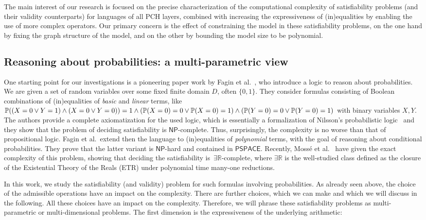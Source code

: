 \documentclass[a4paper,UKenglish,cleveref, autoref, thm-restate]{lipics-v2021}
\newcommand{\R}{\mathbb{R}}
\newcommand{\IR}{\mathbb{R}}
\newcommand{\compactEquals}[1]{\let\IsInPP=1#1\let\IsInPP=\relax}
\newcommand{\PP}[1]{\mathbb{P}(\compactEquals{#1})}
\newcommand{\existsR}{\ensuremath{\mathsf{\exists\IR}}}
\newcommand{\NP}{\ensuremath{\mathsf{NP}}}
\newcommand{\PSPACE}{\ensuremath{\mathsf{PSPACE}}}
\begin{document}
The main interest of our research is focused on the precise characterization of the computational complexity of satisfiability problems (and their validity counterparts) for languages of all PCH layers, combined with increasing the expressiveness of (in)equalities by enabling the use of more 
complex operators. Our primary concern is the effect of constraining the model in these satisfiability problems, on the one hand by fixing the graph structure of the model, and on the other by bounding the model size to be polynomial. 

\subsection{Reasoning about probabilities: a multi-parametric view}

One starting point for our investigations is a pioneering paper work by Fagin et al.~\cite{fagin1990logic}, who introduce a logic to reason about probabilities. We are given a set of random variables over some fixed finite domain $D$, often $\{0,1\}$.  They consider formulas consisting of Boolean combinations of (in)equalities of \emph{basic} and \emph{linear} terms, like 
$\PP{(X = 0 \vee Y=1) \wedge (X = 0 \vee Y = 0)}\compactEquals{=1} \wedge(\PP{X = 0}\compactEquals{=0}\vee \PP{X = 0}\compactEquals{=1})  \wedge(\PP{Y = 0}\compactEquals{=0}\vee \PP{Y = 0}\compactEquals{=1})$ with binary variables $X,Y$. The authors provide a complete axiomatization for the used logic, which is essentially a formalization of  Nilsson’s probabilistic logic~\cite{nilsson1986probabilistic} and they show that the problem of deciding satisfiability is  $\NP$-complete. Thus, surprisingly,  the complexity is no worse than that of propositional logic. Fagin et al.~extend then the language to (in)equalities of \emph{polynomial} terms, with the goal of reasoning about conditional probabilities. They prove that the latter variant is $\NP$-hard and contained in $\PSPACE$. Recently, Moss{\'e} et al.~\cite{ibeling2022mosse} have given the exact complexity of this problem, showing that deciding the satisfiability is~$\existsR$-complete, where $\exists\R$ is the well-studied class defined as the closure of the
Existential Theory of the Reals (ETR) under polynomial time many-one reductions.

In this work, we study the satisfiability (and validity) problem for such formulas involving probabilities. As already seen above, the choice of the admissible operations have an impact on the complexity. There are further choices, which we can make and which we will discuss in the following. All these choices have an impact on the complexity. Therefore, we will phrase these satisfiability problems as multi-parametric or multi-dimensional problems. The first dimension is the expressiveness of the underlying arithmetic:
\end{document}
